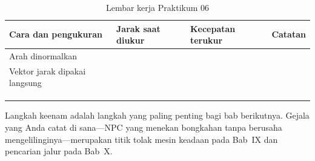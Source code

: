 \begin{table}[htbp]
\centering
\caption{Lembar kerja Praktikum 06}
\label{tab:lembar-praktikum-06}
{\setlength{\tabcolsep}{4pt}\footnotesize%
\begin{tabularx}{\textwidth}{@{}C{4.0cm} C{3.2cm} C{3.2cm} Y@{}}
\toprule
\headrow \textbf{Cara dan pengukuran} & \textbf{Jarak saat diukur} & \textbf{Kecepatan terukur} & \textbf{Catatan} \\
\midrule
Arah dinormalkan & & & \\[1.4em]
\addlinespace
Vektor jarak dipakai langsung & & & \\[1.4em]
\addlinespace
{} \\[1.4em]
\addlinespace
{}
\\[1.4em]
\addlinespace
{} \\[2.0em]
\bottomrule
\end{tabularx}}
\end{table}

\begin{catatabox}
Langkah keenam adalah langkah yang paling penting bagi bab berikutnya. Gejala
yang Anda catat di sana---NPC yang menekan bongkahan tanpa berusaha
mengelilinginya---merupakan titik tolak mesin keadaan pada Bab~IX dan pencarian
jalur pada Bab~X.
\end{catatabox}
